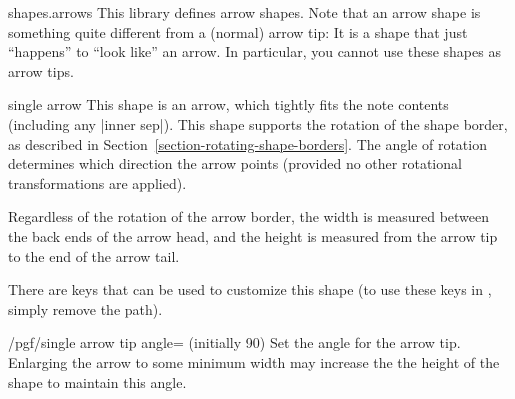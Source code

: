 \begin{pgflibrary}{shapes.arrows}
  This library defines arrow shapes. Note that an arrow shape is
  something quite different from a (normal) arrow tip: It is a shape
  that just ``happens'' to ``look like'' an arrow. In particular, you
  cannot use these shapes as arrow tips.
\end{pgflibrary}

\begin{shape}{single arrow}
	This shape is an arrow, which tightly fits the note contents 
	(including any |inner sep|). 
	This shape supports the rotation of the shape border, as 
	described in Section~\ref{section-rotating-shape-borders}. 
	The angle of rotation determines which direction the arrow
	points (provided no other rotational transformations are applied).
	
\begin{codeexample}[]
\end{codeexample}

	Regardless of the rotation of the arrow border, the width is 
  measured between the back ends of the arrow head, and the 
  height is measured from the arrow tip to the end of the arrow 
  tail.

\begin{codeexample}[]
\end{codeexample}

	There are \pgfname{} keys that can be used to customize this shape (to
	use these keys in \tikzname{}, simply remove the 
	path).
	
\begin{key}{/pgf/single arrow tip angle= (initially 90)}
  Set the angle for the arrow tip. Enlarging the arrow to some
  minimum width may increase the the height of the shape to maintain
  this angle.
\end{key}


\end{shape}
